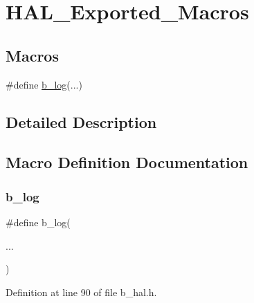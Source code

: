 \hypertarget{group___h_a_l___exported___macros}{}\section{H\+A\+L\+\_\+\+Exported\+\_\+\+Macros}
\label{group___h_a_l___exported___macros}
\subsection*{Macros}
\begin{DoxyCompactItemize}
\item 
\#define \mbox{\hyperlink{group___h_a_l___exported___macros_gafc78b16ad8aebf30b9cabfc278cfb32a}{b\+\_\+log}}(...)
\end{DoxyCompactItemize}


\subsection{Detailed Description}


\subsection{Macro Definition Documentation}
\mbox{\label{group___h_a_l___exported___macros_gafc78b16ad8aebf30b9cabfc278cfb32a}} 
\subsubsection{\texorpdfstring{b\+\_\+log}{b\_log}}
{\footnotesize\ttfamily \#define b\+\_\+log(\begin{DoxyParamCaption}\item[{}]{... }\end{DoxyParamCaption})}



Definition at line 90 of file b\+\_\+hal.\+h.

